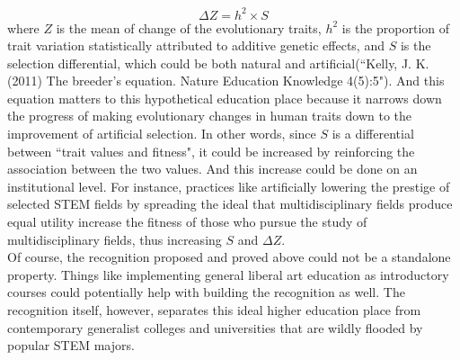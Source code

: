 \documentclass[12pt]{article}
\newcommand\tab[1][1cm]{\hspace*{#1}}
\begin{document}
\begin{equation}
\Delta Z = h^2 \times S
\end{equation}
where $Z$ is the mean of change of the evolutionary traits, $h^2$ is the proportion of trait variation statistically attributed to additive genetic effects, and $S$ is the selection differential, which could be both natural and artificial(``Kelly, J. K. (2011) The breeder's equation. Nature Education Knowledge 4(5):5"). And this equation matters to this hypothetical education place because it narrows down the progress of making evolutionary changes in human traits down to the improvement of artificial selection. In other words, since $S$ is a differential between ``trait values and fitness", it could be increased by reinforcing the association between the two values. And this increase could be done on an institutional level. For instance, practices like artificially lowering the prestige of selected STEM fields by spreading the ideal that multidisciplinary fields produce equal utility increase the fitness of those who pursue the study of multidisciplinary fields, thus increasing $S$ and $\Delta Z$. \\
\tab Of course, the recognition proposed and proved above could not be a standalone property. Things like implementing general liberal art education as introductory courses could potentially help with building the recognition as well. The recognition itself, however, separates this ideal higher education place from contemporary generalist colleges and universities that are wildly flooded by popular STEM majors. 



\pagebreak
\end{document}
